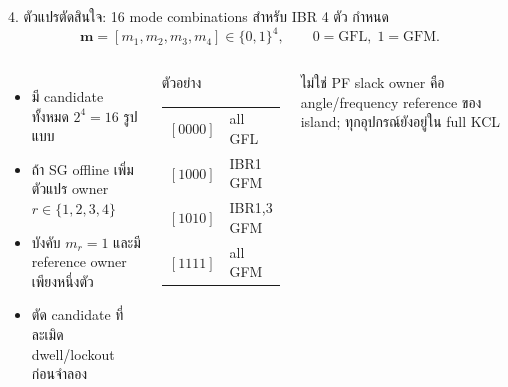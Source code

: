 \documentclass[aspectratio=169,12pt]{beamer}
\begin{document}
\begin{frame}[shrink=8]{4. ตัวแปรตัดสินใจ: 16 mode combinations}
สำหรับ IBR 4 ตัว กำหนด
\[
\mathbf m=[m_1,m_2,m_3,m_4]\in\{0,1\}^4,
\qquad 0=\mathrm{GFL},\;1=\mathrm{GFM}.
\]
\begin{columns}[T,onlytextwidth]
\begin{itemize}
  \item มี candidate ทั้งหมด $2^4=16$ รูปแบบ
  \item ถ้า SG offline เพิ่มตัวแปร owner $r\in\{1,2,3,4\}$
  \item บังคับ $m_r=1$ และมี reference owner เพียงหนึ่งตัว
  \item ตัด candidate ที่ละเมิด dwell/lockout ก่อนจำลอง
\end{itemize}
\begin{block}{ตัวอย่าง}
\begin{tabular}{cl}
$[0000]$ & all GFL \\
$[1000]$ & IBR1 GFM \\
$[1010]$ & IBR1,3 GFM \\
$[1111]$ & all GFM
\end{tabular}
\end{block}
\begin{alertblock}{ไม่ใช่ PF slack}
owner คือ angle/frequency reference ของ island; ทุกอุปกรณ์ยังอยู่ใน full KCL
\end{alertblock}
\end{columns}
\end{frame}
\end{document}
